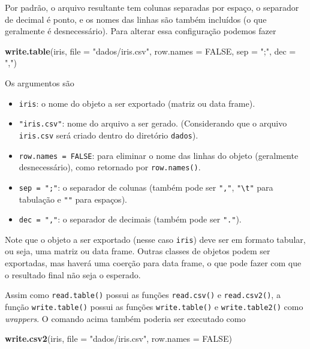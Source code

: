 \documentclass[10pt,a4paper]{book}
\newenvironment{Shaded}{\begin{snugshade}}{\end{snugshade}}
\newcommand{\KeywordTok}[1]{\textcolor[rgb]{0.13,0.29,0.53}{\textbf{#1}}}
\newcommand{\DataTypeTok}[1]{\textcolor[rgb]{0.13,0.29,0.53}{#1}}
\newcommand{\StringTok}[1]{\textcolor[rgb]{0.31,0.60,0.02}{#1}}
\newcommand{\OtherTok}[1]{\textcolor[rgb]{0.56,0.35,0.01}{#1}}
\newcommand{\NormalTok}[1]{#1}
\providecommand{\tightlist}{%
  \setlength{\itemsep}{0pt}\setlength{\parskip}{0pt}}
\begin{document}
Por padrão, o arquivo resultante tem colunas separadas por espaço, o
separador de decimal é ponto, e os nomes das linhas são também incluídos
(o que geralmente é desnecessário). Para alterar essa configuração
podemos fazer

\begin{Shaded}
\begin{Highlighting}[]
\KeywordTok{write.table}\NormalTok{(iris, }\DataTypeTok{file =} \StringTok{"dados/iris.csv"}\NormalTok{, }\DataTypeTok{row.names =} \OtherTok{FALSE}\NormalTok{,}
            \DataTypeTok{sep =} \StringTok{";"}\NormalTok{, }\DataTypeTok{dec =} \StringTok{","}\NormalTok{)}
\end{Highlighting}
\end{Shaded}

Os argumentos são

\begin{itemize}
\tightlist
\item
  \texttt{iris}: o nome do objeto a ser exportado (matriz ou data
  frame).
\item
  \texttt{"iris.csv"}: nome do arquivo a ser gerado. (Considerando que o
  arquivo \texttt{iris.csv} será criado dentro do diretório
  \texttt{dados}).
\item
  \texttt{row.names\ =\ FALSE}: para eliminar o nome das linhas do
  objeto (geralmente desnecessário), como retornado por
  \texttt{row.names()}.
\item
  \texttt{sep\ =\ ";"}: o separador de colunas (também pode ser
  \texttt{","}, \texttt{"\textbackslash{}t"} para tabulação e
  \texttt{""} para espaços).
\item
  \texttt{dec\ =\ ","}: o separador de decimais (também pode ser
  \texttt{"."}).
\end{itemize}

Note que o objeto a ser exportado (nesse caso \texttt{iris}) deve ser em
formato tabular, ou seja, uma matriz ou data frame. Outras classes de
objetos podem ser exportadas, mas haverá uma coerção para data frame, o
que pode fazer com que o resultado final não seja o esperado.

Assim como \texttt{read.table()} possui as funções \texttt{read.csv()} e
\texttt{read.csv2()}, a função \texttt{write.table()} possui as funções
\texttt{write.table()} e \texttt{write.table2()} como \emph{wrappers}. O
comando acima também poderia ser executado como

\begin{Shaded}
\begin{Highlighting}[]
\KeywordTok{write.csv2}\NormalTok{(iris, }\DataTypeTok{file =} \StringTok{"dados/iris.csv"}\NormalTok{, }\DataTypeTok{row.names =} \OtherTok{FALSE}\NormalTok{)}
\end{Highlighting}
\end{Shaded}
\end{document}
